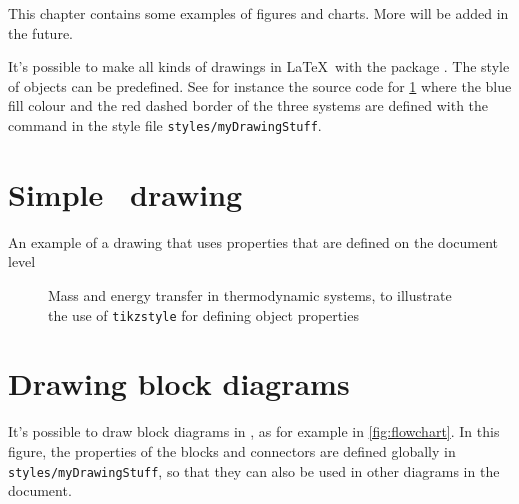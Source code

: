 \label{ch:drawing}
This chapter contains some examples of figures and charts. More will be added in the future.

It's possible to make all kinds of drawings in \LaTeX\ with the package . The style of objects can be predefined. See for instance the source code for \cref{fig:3systems} where the blue fill colour and the red dashed border of the three systems are defined with the command  in the style file \verb|styles/myDrawingStuff|.

\section{Simple \TikZ\ drawing}

\begin{frame}{An example of a drawing that uses properties that are defined on the document level}
    \begin{figure}[htbp]\centering
    	\caption{Mass and energy transfer in thermodynamic systems, to illustrate the use of \texttt{tikzstyle} for defining object properties}\label{fig:3systems}
    \end{figure}
\end{frame}

\section{Drawing block diagrams}
It's possible to draw block diagrams in \TikZ, as for example in \cref{fig:flowchart}. In this figure, the properties of the blocks and connectors are defined globally in \verb|styles/myDrawingStuff|, so that they can also be used in other diagrams in the document.

